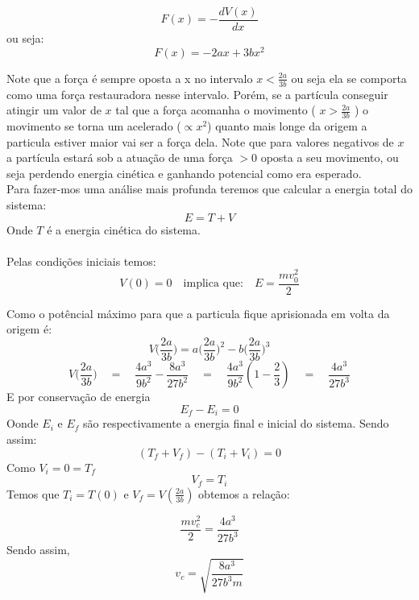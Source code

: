 \documentclass[a4paper,12pt]{article}
\begin{document}
	\[ F(x) = -\frac{dV(x)}{dx}\]
	ou seja:
	\[ F(x) = -2ax + 3bx^2 \]
	
		Note que a força é sempre oposta a x no intervalo $x < \frac{2a}{3b}$ ou seja ela se comporta como uma força restauradora nesse intervalo.
		Porém, se a partícula conseguir atingir um valor de $x$ tal que a força acomanha o movimento ( $x > \frac{2a}{3b}$ ) o movimento se torna um acelerado ($\propto x^2$) quanto mais longe da origem a particula estiver maior vai ser a força dela.
		Note que para valores negativos de $x$ a partícula estará sob a atuação de uma força $>0$ oposta a seu movimento, ou seja perdendo energia cinética e ganhando potencial como era esperado.\\
		
		\indent Para fazer-mos uma análise mais profunda teremos que calcular a energia total do sistema:
		\[ E = T + V \] Onde $T$ é a energia cinética do sistema.\\ \\
		Pelas condições iniciais temos:
		\[ V(0) = 0 \quad \text{implica que:} \quad E = \frac{mv_{0}^{2}}{2}\]
		
		Como o potêncial máximo para que a particula fique aprisionada em volta da origem é: \[ V\Big(\frac{2a}{3b}\Big) = a\Big(\frac{2a}{3b}\Big)^2 -b\Big(\frac{2a}{3b}\Big)^3 \]
		\[ V\Big(\frac{2a}{3b}\Big) \quad = \quad \frac{4a^3}{9b^2} - \frac{8a^3}{27b^2} \quad = \quad \frac{4a^3}{9b^2}(1-\frac{2}{3}) \quad = \quad \frac{4a^3}{27b^3}\]
		E por conservação de energia \[ E_f - E_i = 0\] Oonde $E_i$ e $E_f$ são respectivamente a energia final e inicial do sistema.
		Sendo assim:
		\[ (T_f + V_f) - (T_i + V_i) = 0\]
		Como $ V_i = 0 = T_f$
		\[V_f = T_i\]
		Temos que $T_i = T(0)$ e $V_f = V(\frac{2a}{3b})$ obtemos a relação:
		
		\[ \frac{mv_{c}^{2}}{2} = \frac{4a^3}{27b^3} \]
		Sendo assim,
		\[ v_c = \sqrt{\frac{8a^3}{27b^3 m}} \]
	
\end{document}
